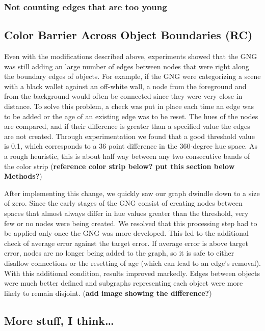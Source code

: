 \documentclass{article}
\renewcommand{\|}{\origbar} %
\begin{document}
\subsubsection{Not counting edges that are too young}

\subsection{Color Barrier Across Object Boundaries (RC)}

Even with the modifications described above, experiments showed that the GNG was still adding an large number of edges between nodes that were right along the boundary edges of objects. For example, if the GNG were categorizing a scene with a black wallet against an off-white wall, a node from the foreground and from the background would often be connected since they were very close in distance. To solve this problem, a check was put in place each time an edge was to be added or the age of an existing edge was to be reset. The hues of the nodes are compared, and if their difference is greater than a specified value the edges are not created. Through experimentation we found that a good threshold value is 0.1, which corresponds to a 36 point difference in the 360-degree hue space. As a rough heuristic, this is about half way between any two consecutive bands of the color strip ({\bf reference color strip below? put this section below Methods?})

After implementing this change, we quickly saw our graph dwindle down to a size of zero. Since the early stages of the GNG consist of creating nodes between spaces that almost always differ in hue values greater than the threshold, very few or no nodes were being created. We resolved that this processing step had to be applied only once the GNG was more developed. This led to the additional check of average error against the target error. If average error is above target error, nodes are no longer being added to the graph, so it is safe to either disallow connections or the resetting of age (which can lead to an edge's removal). With this additional condition, results improved markedly. Edges between objects were much better defined and subgraphs representing each object were more likely to remain disjoint. ({\bf add image showing the difference?})

\subsection{More stuff, I think\dots}
\end{document}
